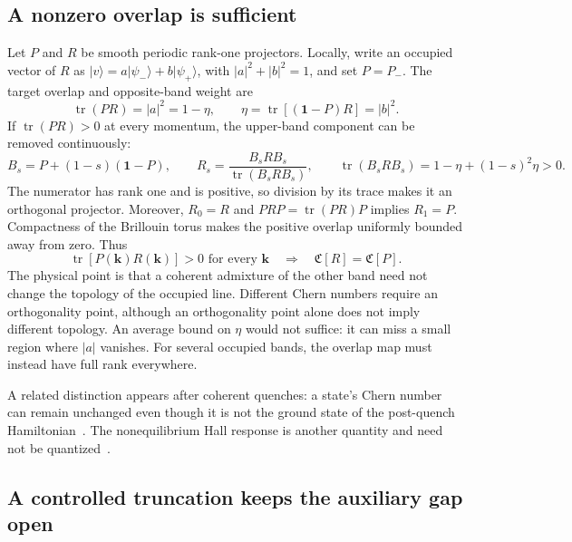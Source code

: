 \documentclass[aps,prb,onecolumn,nofootinbib,superscriptaddress]{revtex4-2}
\newcommand{\id}{\mathbf{1}}
\newcommand{\tr}{\operatorname{tr}}
\newcommand{\Ch}{\mathfrak C}
\newcommand{\bk}{\boldsymbol k}
\newcommand{\ket}[1]{\lvert#1\rangle}
\begin{document}
\subsection{A nonzero overlap is sufficient}

Let $P$ and $R$ be smooth periodic rank-one projectors. Locally, write an
occupied vector of $R$ as
$\ket v=a\ket{\psi_-}+b\ket{\psi_+}$, with
$|a|^2+|b|^2=1$, and set $P=P_-$.
The target overlap and opposite-band weight are
\begin{equation}
 \tr(PR)=|a|^2=1-\eta,\qquad
 \eta=\tr[(\id-P)R]=|b|^2.
 \label{eq:eta}
\end{equation}
If $\tr(PR)>0$ at every momentum, the upper-band component can be removed
continuously:
\begin{equation}
 B_s=P+(1-s)(\id-P),\qquad
 R_s=\frac{B_sRB_s}{\tr(B_sRB_s)},\qquad
 \tr(B_sRB_s)=1-\eta+(1-s)^2\eta>0.
 \label{eq:overlap-path}
\end{equation}
The numerator has rank one and is positive, so division by its trace makes
it an orthogonal projector. Moreover, $R_0=R$ and
$PRP=\tr(PR)P$ implies $R_1=P$. Compactness of the Brillouin torus makes
the positive overlap uniformly bounded away from zero. Thus
\begin{equation}
 \tr[P(\bk)R(\bk)]>0\text{ for every }\bk
 \quad\Longrightarrow\quad \Ch[R]=\Ch[P].
 \label{eq:overlap-result}
\end{equation}
The physical point is that a coherent admixture of the other band need not
change the topology of the occupied line. Different Chern numbers require
an orthogonality point, although an orthogonality point alone does not imply
different topology. An average bound on $\eta$ would not suffice: it can
miss a small region where $|a|$ vanishes. For several occupied bands, the
overlap map must instead have full rank everywhere.

A related distinction appears after coherent quenches: a state's Chern
number can remain unchanged even though it is not the ground state of the
post-quench Hamiltonian~\cite{Caio2015}. The nonequilibrium Hall response is
another quantity and need not be quantized~\cite{Caio2016}.

\subsection{A controlled truncation keeps the auxiliary gap open}
\end{document}
